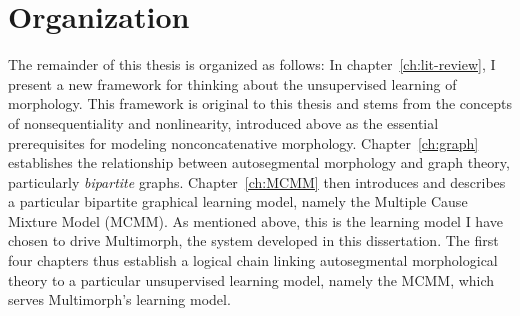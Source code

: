%

\section{Organization}
The remainder of this thesis is organized as follows: In chapter~\ref{ch:lit-review}, I present a new framework for thinking about the unsupervised learning of morphology. This framework is original to this thesis and stems from the concepts of nonsequentiality and nonlinearity, introduced above as the essential prerequisites for modeling nonconcatenative morphology. Chapter~\ref{ch:graph} establishes the relationship between autosegmental morphology and graph theory, particularly \emph{bipartite} graphs. Chapter~\ref{ch:MCMM} then introduces and describes a particular bipartite graphical learning model, namely the Multiple Cause Mixture Model (MCMM). As mentioned above, this is the learning model I have chosen to drive Multimorph, the system developed in this dissertation. The first four chapters thus establish a logical chain linking autosegmental morphological theory to a particular unsupervised learning model, namely the MCMM, which serves Multimorph's learning model. 

